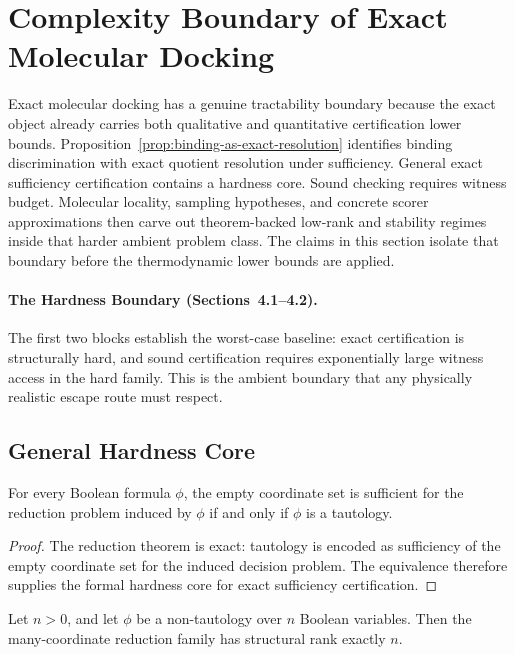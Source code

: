 \section{Complexity Boundary of Exact Molecular Docking}\label{complexity-boundary}

Exact molecular docking has a genuine tractability boundary because the exact object already carries both qualitative and quantitative certification lower bounds. Proposition~\ref{prop:binding-as-exact-resolution} identifies binding discrimination with exact quotient resolution under sufficiency. General exact sufficiency certification contains a hardness core. Sound checking requires witness budget. Molecular locality, sampling hypotheses, and concrete scorer approximations then carve out theorem-backed low-rank and stability regimes inside that harder ambient problem class. The claims in this section isolate that boundary before the thermodynamic lower bounds are applied.

\paragraph{The Hardness Boundary (Sections~4.1--4.2).}
The first two blocks establish the worst-case baseline: exact certification is structurally hard, and sound certification requires exponentially large witness access in the hard family. This is the ambient boundary that any physically realistic escape route must respect.

\subsection{General Hardness Core}

\begin{theorem}\label{thm:exact-sufficiency-hardness-core}
For every Boolean formula $\phi$, the empty coordinate set is sufficient for the reduction problem induced by $\phi$ if and only if $\phi$ is a tautology.
\end{theorem}

\begin{proof}
The reduction theorem is exact: tautology is encoded as sufficiency of the empty coordinate set for the induced decision problem. The equivalence therefore supplies the formal hardness core for exact sufficiency certification.
\end{proof}

\begin{theorem}\label{thm:hard-family-srank}
Let $n>0$, and let $\phi$ be a non-tautology over $n$ Boolean variables. Then the many-coordinate reduction family has structural rank exactly $n$.
\end{theorem}

